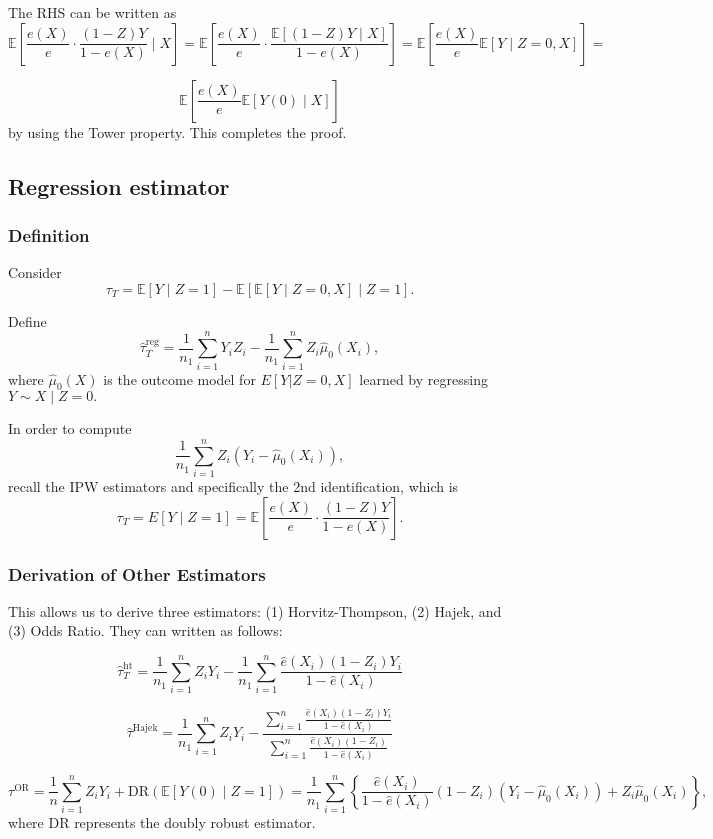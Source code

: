 \noindent The RHS can be written as $$\mathbb{E}\left[\frac{e(X)}{e} \cdot \frac{(1-Z)Y}{1-e(X)} \mid X\right] = \mathbb{E}\left[\frac{e(X)}{e} \cdot \frac{\mathbb{E}[(1-Z)Y \mid X]}{1-e(X)}\right] = \mathbb{E}\left[\frac{e(X)}{e} \mathbb{E}[Y \mid Z=0, X]\right] = $$

$$\mathbb{E}\left[\frac{e(X)}{e} \mathbb{E}[Y(0) \mid X]\right]$$ by using the Tower property. This completes the proof. 

\subsection{Regression estimator}

\subsubsection{Definition}

Consider $$\tau_T = \mathbb{E}[Y \mid Z = 1] - \mathbb{E}[\mathbb{E}[Y \mid Z = 0, X] \mid Z = 1].$$

Define $$\hat{\tau}_T^{\text{reg}} = \frac{1}{n_1} \sum_{i=1}^{n} Y_i Z_i - \frac{1}{n_1} \sum_{i=1}^{n} Z_i \hat{\mu}_0(X_i),$$ where $\hat{\mu}_0(X)$ is the outcome model for $E[Y|Z=0,X]$ learned by regressing $Y \sim X \mid Z=0.$

In order to compute $$\frac{1}{n_1} \sum_{i=1}^{n} Z_i \left(Y_i - \hat{\mu}_0(X_i)\right),$$ recall the IPW estimators and specifically the 2nd identification, which is $$\tau_{T} = E[Y \mid Z=1] = \mathbb{E}\left[\frac{e(X)}{e} \cdot \frac{(1-Z)Y}{1-e(X)}\right].$$ 

\subsubsection{Derivation of Other Estimators}
\noindent This allows us to derive three estimators: (1) Horvitz-Thompson, (2) Hajek, and (3) Odds Ratio. They can written as follows: 

$$\hat{\tau}_T^{\text{ht}} = \frac{1}{n_1} \sum_{i=1}^{n} Z_i Y_i - \frac{1}{n_1} \sum_{i=1}^{n} \frac{\hat{e}(X_i)(1-Z_i) Y_i}{1 - \hat{e}(X_i)}$$

$$\hat{\tau}^{\text{Hajek}} = \frac{1}{n_1} \sum_{i=1}^{n} Z_i Y_i - \frac{\sum_{i=1}^{n} \frac{\hat{e}(X_i)(1-Z_i)Y_i}{1 - \hat{e}(X_i)}}{\sum_{i=1}^{n} \frac{\hat{e}(X_i)(1-Z_i)}{1 - \hat{e}(X_i)}}$$

$$\tau^{\text{OR}} = \frac{1}{n} \sum_{i=1}^{n} Z_i Y_i + \text{DR}(\mathbb{E}[Y(0) \mid Z = 1]) = \frac{1}{n_1} \sum_{i=1}^{n} \left\{ \frac{\hat{e}(X_i)}{1 - \hat{e}(X_i)} (1 - Z_i)(Y_i - \hat{\mu}_0(X_i)) + Z_i \hat{\mu}_0(X_i) \right\},$$ where DR represents the doubly robust estimator.

